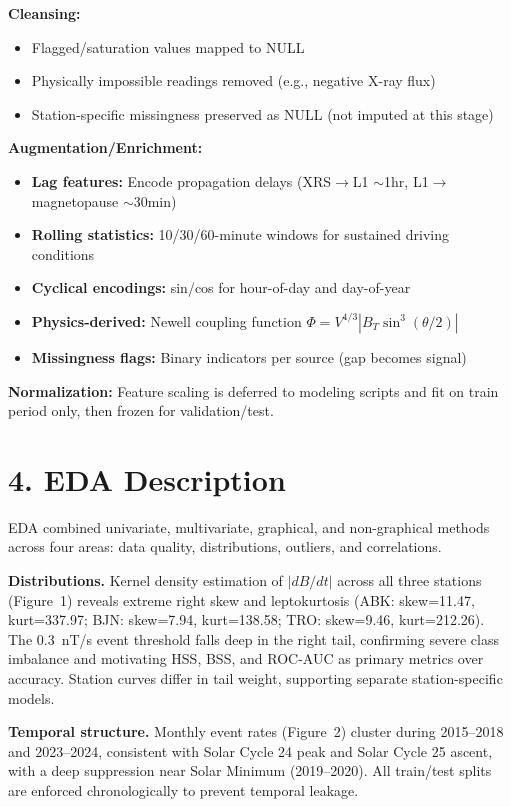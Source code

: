 \documentclass{article}
\begin{document}
\textbf{Cleansing:} 
\begin{itemize}
  \item Flagged/saturation values mapped to NULL
  \item Physically impossible readings removed (e.g., negative X-ray flux)
  \item Station-specific missingness preserved as NULL (not imputed at this stage)
\end{itemize}

\textbf{Augmentation/Enrichment:}
\begin{itemize}
  \item \textbf{Lag features:} Encode propagation delays (XRS$\to$L1 $\sim$1hr, L1$\to$magnetopause $\sim$30min)
  \item \textbf{Rolling statistics:} 10/30/60-minute windows for sustained driving conditions
  \item \textbf{Cyclical encodings:} sin/cos for hour-of-day and day-of-year
  \item \textbf{Physics-derived:} Newell coupling function $\Phi = V^{4/3} |B_T \sin^3(\theta/2)|$
  \item \textbf{Missingness flags:} Binary indicators per source (gap becomes signal)
\end{itemize}

\textbf{Normalization:} Feature scaling is deferred to modeling scripts and fit on train period only, then frozen for validation/test.

\section*{4. EDA Description}

EDA combined univariate, multivariate, graphical, and non-graphical methods
across four areas: data quality, distributions, outliers, and correlations.

\textbf{Distributions.} Kernel density estimation of $|dB/dt|$ across all
three stations (Figure~1) reveals extreme right skew and leptokurtosis
(ABK: skew=11.47, kurt=337.97; BJN: skew=7.94, kurt=138.58; TRO:
skew=9.46, kurt=212.26). The 0.3~nT/s event threshold falls deep in the
right tail, confirming severe class imbalance and motivating HSS, BSS, and
ROC-AUC as primary metrics over accuracy. Station curves differ in tail
weight, supporting separate station-specific models.

\textbf{Temporal structure.} Monthly event rates (Figure~2) cluster during
2015--2018 and 2023--2024, consistent with Solar Cycle 24 peak and Solar
Cycle 25 ascent, with a deep suppression near Solar Minimum (2019--2020).
All train/test splits are enforced chronologically to prevent temporal
leakage.
\end{document}

